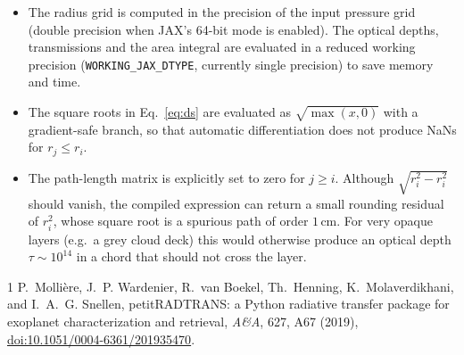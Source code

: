 \documentclass[11pt,a4paper]{article}
\newcommand{\code}[1]{\texttt{#1}}
\begin{document}
\begin{itemize}
  \item The radius grid is computed in the precision of the input pressure
        grid (double precision when JAX's 64-bit mode is enabled). The
        optical depths, transmissions and the area integral are evaluated in
        a reduced working precision (\code{WORKING\_JAX\_DTYPE}, currently
        single precision) to save memory and time.
  \item The square roots in Eq.~\eqref{eq:ds} are evaluated as
        $\sqrt{\max(x,0)}$ with a gradient-safe branch, so that automatic
        differentiation does not produce NaNs for $r_j \le r_i$.
  \item The path-length matrix is explicitly set to zero for $j \ge i$.
        Although $\sqrt{r_i^2 - r_i^2}$ should vanish, the compiled
        expression can return a small rounding residual of $r_i^2$, whose
        square root is a spurious path of order $1\,$cm. For very opaque
        layers (e.g.\ a grey cloud deck) this would otherwise produce an
        optical depth $\tau \sim 10^{14}$ in a chord that should not cross
        the layer.
\end{itemize}

\begin{thebibliography}{1}
P.~Molli\`ere, J.~P. Wardenier, R.~van Boekel, Th.~Henning,
K.~Molaverdikhani, and I.~A.~G. Snellen,
\newblock petitRADTRANS: a Python radiative transfer package for exoplanet
characterization and retrieval,
\newblock \emph{A\&A}, 627, A67 (2019),
\newblock \href{https://doi.org/10.1051/0004-6361/201935470}{doi:10.1051/0004-6361/201935470}.
\end{thebibliography}
\end{document}

